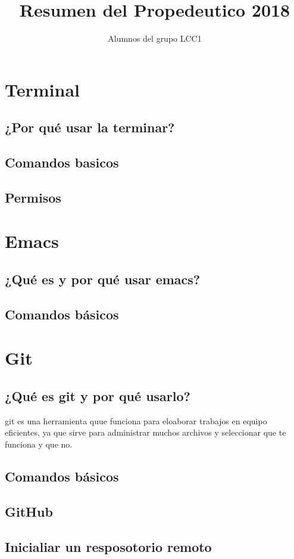 \documentclass[11pt,letterpaper]{article}
\title{Resumen del Propedeutico 2018}
\author{Alumnos del grupo LCC1}
\begin{document}
\maketitle
\section{Terminal}
\subsection{¿Por qué usar la terminar?}
\subsection{Comandos basicos}
\subsection{Permisos}
\section{Emacs}
\subsection{¿Qué es y por qué usar emacs?}
\subsection{Comandos básicos}

\section{Git}
\subsection{¿Qué es git y por qué usarlo?}
git es una herramienta quue funciona para eloaborar trabajos en equipo eficientes, ya que sirve para administrar muchos archivos y seleccionar que te funciona y que no.
\subsection{Comandos básicos}

\subsection{GitHub}
\subsection{Inicialiar un resposotorio remoto}
\end{document}
